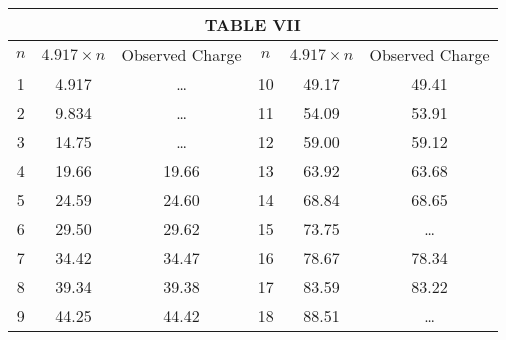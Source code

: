 \documentclass{article}
\begin{document}
\bigskip

\begin{center}
\begin{tabular}{c|c|c|c|c|c}
\hline
\multicolumn{6}{c}{TABLE VII}\\
\hline
$n$ & $4.917\!\times\!{n}$ & Observed Charge & $n$ & $4.917\!\times\!{n}$ & Observed Charge\\
\hline
1 & 4.917 & \ldots & 10 & 49.17 & 49.41\\
2 & 9.834 & \ldots & 11 & 54.09 & 53.91\\
3 & 14.75 & \ldots & 12 & 59.00 & 59.12\\
4 & 19.66 & 19.66  & 13 & 63.92 & 63.68\\
5 & 24.59 & 24.60  & 14 & 68.84 & 68.65\\
6 & 29.50 & 29.62  & 15 & 73.75 & \ldots\\
7 & 34.42 & 34.47  & 16 & 78.67 & 78.34\\
8 & 39.34 & 39.38  & 17 & 83.59 & 83.22\\
9 & 44.25 & 44.42  & 18 & 88.51 & \ldots\\
\hline
\end{tabular}
\end{center}

\bigskip
\end{document}
